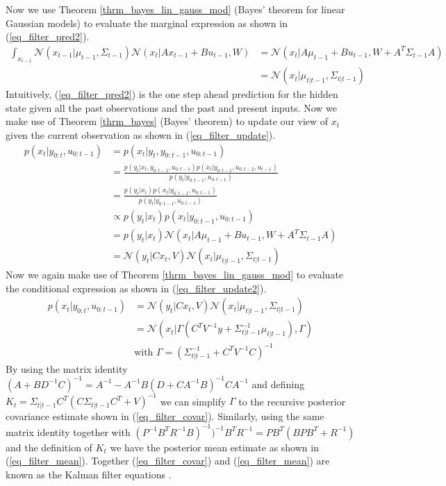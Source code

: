 Now we use Theorem \ref{thrm_bayes_lin_gauss_mod} (Bayes' theorem for linear Gaussian models) to evaluate the marginal expression as shown in (\ref{eq_filter_pred2}).
\begin{equation}
\begin{aligned}
\int_{x_{t-1}} \mathcal{N}(x_{t-1}|\mu_{t-1}, \Sigma_{t-1}) \mathcal{N}(x_{t}|Ax_{t-1}+Bu_{t-1}, W) &= \mathcal{N}(x_t|A\mu_{t-1}+Bu_{t-1
}, W+ A^T\Sigma_{t-1}A) \\
&= \mathcal{N}(x_t|\mu_{t|t-1},\Sigma_{t|t-1})
\end{aligned}
\label{eq_filter_pred2}
\end{equation}
Intuitively, (\ref{eq_filter_pred2}) is the one step ahead prediction for the hidden state given all the past observations and the past and present inputs. Now we make use of Theorem \ref{thrm_bayes} (Bayes' theorem) to update our view of $x_t$ given the current observation as shown in (\ref{eq_filter_update}).
\begin{equation}
\begin{aligned}
p(x_t|y_{0:t},u_{0:t-1}) &= p(x_t|y_{t},y_{0:t-1},u_{0:t-1}) \\
&= \frac{p(y_t|x_t,y_{0:t-1},u_{0:t-1})p(x_t|y_{0:t-1},u_{0:t-2}, u_{t-1})}{p(y_t|y_{0:t-1},u_{0:t-1})} \\
&= \frac{p(y_t|x_t)p(x_t|y_{0:t-1},u_{0:t-1})}{p(y_t|y_{0:t-1},u_{0:t-1})} \\
&\propto p(y_t|x_t)p(x_t|y_{0:t-1},u_{0:t-1})\\
&= p(y_t|x_t)\mathcal{N}(x_t|A\mu_{t-1}+Bu_{t-1
}, W+ A^T\Sigma_{t-1}A) \\
&= \mathcal{N}(y_{t}|Cx_{t}, V)\mathcal{N}(x_t|\mu_{t|t-1},\Sigma_{t|t-1})
\end{aligned}
\label{eq_filter_update}
\end{equation}
Now we again make use of Theorem \ref{thrm_bayes_lin_gauss_mod} to evaluate the conditional expression as shown in (\ref{eq_filter_update2}).
\begin{equation}
\begin{aligned}
p(x_t|y_{0:t},u_{0:t-1}) &=\mathcal{N}(y_{t}|Cx_{t}, V)\mathcal{N}(x_t|\mu_{t|t-1},\Sigma_{t|t-1})\\ 
&= \mathcal{N}(x_t|\Gamma(C^TV^{-1}y + \Sigma_{t|t-1}^{-1}\mu_{t|t-1}), \Gamma) \\
&\text{with } \Gamma = (\Sigma_{t|t-1}^{-1}+C^TV^{-1}C)^{-1} 
\end{aligned}
\label{eq_filter_update2}
\end{equation} 
By using the matrix identity $(A+BD^{-1}C)^{-1}=A^{-1}-A^{-1}B(D+CA^{-1}B)^{-1}CA^{-1}$ and defining $K_t = \Sigma_{t|t-1}C^T(C\Sigma_{t|t-1}C^T+V)^{-1}$ we can simplify $\Gamma$ to the recursive posterior covariance estimate shown in (\ref{eq_filter_covar}). Similarly, using the same matrix identity together with $(P^{-1} B^TR^{-1}B)^{-1})^{-1}B^TR^{-1} = PB^T(BPB^T+R^{-1})$ and the definition of $K_t$ we have the posterior mean estimate as shown in (\ref{eq_filter_mean}). Together (\ref{eq_filter_covar}) and (\ref{eq_filter_mean}) are known as the Kalman filter equations \cite{murphy2}.
